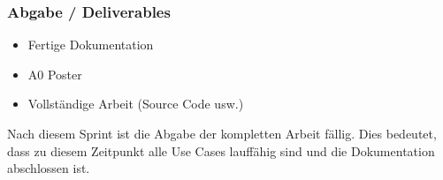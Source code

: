\subsubsection{Abgabe / Deliverables}
\begin{itemize}
	\item Fertige Dokumentation
	\item A0 Poster
	\item Vollständige Arbeit (Source Code usw.)
\end{itemize}

Nach diesem Sprint ist die Abgabe der kompletten Arbeit fällig. Dies bedeutet, dass zu diesem Zeitpunkt alle Use Cases lauffähig sind und die Dokumentation abschlossen ist. 
